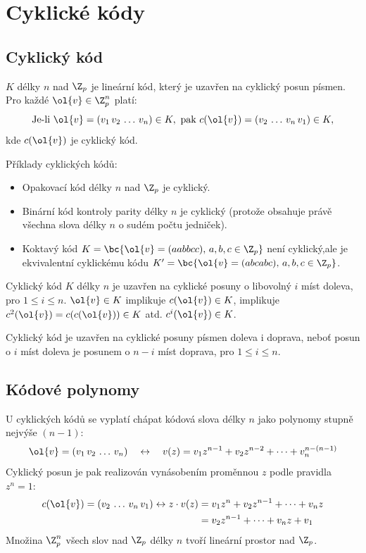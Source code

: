 \section{Cyklické kódy}

\subsection{Cyklický kód}
 $K$ délky $n$ nad $\Z_p$ je lineární kód, který je uzavřen na cyklický posun písmen. Pro každé $\ol{v} \in \Z_p^n$ platí:
\begin{equation}
	\text{Je-li } \ol{v} = (v_1 \, v_2 \, \dots \, v_n) \in K, \text{ pak } c(\ol{v}) = (v_2 \, \dots \, v_n \, v_1) \in K,
\end{equation}
kde $c(\ol{v})$ je cyklický kód.

Příklady cyklických kódů:
\vspace{-1em}
\begin{itemize}
	\item Opakovací kód délky $n$ nad $\Z_p$ je cyklický.
	\item Binární kód kontroly parity délky $n$ je cyklický (protože obsahuje právě všechna slova délky $n$ o sudém počtu jedniček).
	\item Koktavý kód $K = \bc{\ol{v} = (aabbcc), \, a,b,c\in \Z_p}$ není cyklický,ale je ekvivalentní cyklickému kódu $K^\prime = \bc{\ol{v} = (abcabc), \, a,b,c\in \Z_p}$.
\end{itemize}
\vspace{-1em}
Cyklický kód $K$ délky $n$ je uzavřen na cyklické posuny o libovolný $i$ míst doleva, pro $1 \leq i \leq n$. $\ol{v} \in K$ implikuje $c(\ol{v}) \in K$, implikuje $c^2 (\ol{v}) = c(c(\ol{v})) \in K$ atd. $c^i(\ol{v}) \in K$.

Cyklický kód je uzavřen na cyklické posuny písmen doleva i doprava, neboť posun o $i$ míst doleva je posunem o $n-i$ míst doprava, pro $1 \leq i \leq n$.

\subsection{Kódové polynomy}
 U cyklických kódů se vyplatí chápat kódová slova délky $n$ jako polynomy stupně nejvýše $(n-1)$:
\begin{equation}
	\ol{v} = (v_1 \, v_2 \, \dots \, v_n) \quad \leftrightarrow \quad v(z)= v_1 z^{n-1} + v_2 z^{n-2} + \dots + v_n^{n-(n-1)}
\end{equation}
Cyklický posun je pak realizován vynásobením proměnnou $z$ podle pravidla $z^n = 1$:
\begin{align}
\begin{split}
		c(\ol{v}) = (v_2 \, \dots \, v_n \, v_1) \leftrightarrow z \cdot v(z) &= v_1 z^n + v_2z^{n-1} + \dots + v_nz \\
		&= v_2 z^{n-1} + \dots + v_nz + v_1
\end{split}
\end{align}
Množina $\Z_p^n$ všech slov nad $\Z_p$ délky $n$ tvoří lineární prostor nad $\Z_p$.

